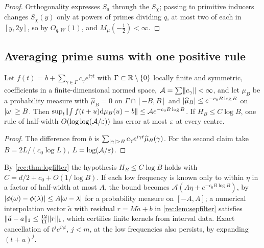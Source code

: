\begin{proof}
Orthogonality expresses $S_a$ through the $S_\chi$; passing to primitive inducers changes $S_\chi(y)$ only at
powers of primes dividing $q$, at most two of each in $[y,2y]$, so by $O_{q,W}(1)$, and $M_\mu(-\tfrac12)<\infty$.
\end{proof}

\subsection{Averaging prime sums with one positive rule}\label{fil:sec:primes}

\begin{theorem}\label{rec:thm:uniformavg}
Let $f(t)=b+\sum_{\gamma\in\Gamma}c_\gamma e^{i\gamma t}$ with $\Gamma\subset\mathbb{R}\setminus\{0\}$ locally finite and symmetric, coefficients in a
finite-dimensional normed space, $\mathcal A=\sum\lVert c_\gamma\rVert<\infty$, and let $\mu_B$ be a probability measure with
$\widehat\mu_B=0$ on $\Gamma\cap[-B,B]$ and $\lvert\widehat\mu_B\rvert\le e^{-c_0B\log B}$ on $\lvert\omega\rvert\ge B$. Then
$\sup_t\lVert\int f(t+u)\mathrm{d}\mu_B(u)-b\rVert\le\mathcal Ae^{-c_0B\log B}$. If $H_B\le C\log B$, one rule of half-width
$O(\log\log(\mathcal A/\varepsilon))$ has error at most $\varepsilon$ at every centre.
\end{theorem}

\begin{proof}
The difference from $b$ is $\sum_{\lvert\gamma\rvert>B}c_\gamma e^{i\gamma t}\widehat\mu_B(\gamma)$. For the second claim take
$B=2L/(c_0\log L)$, $L=\log(\mathcal A/\varepsilon)$.
\end{proof}

By \cref{rec:thm:logfilter} the hypothesis $H_B\le C\log B$ holds with $C=d/2+c_0+O(1/\log B)$. If each low frequency
is known only to within $\eta$ in a factor of half-width at most $A$, the bound becomes
$\mathcal A(A\eta+e^{-c_0B\log B})$, by $\lvert\phi(\omega)-\phi(\lambda)\rvert\le A\lvert\omega-\lambda\rvert$ for a probability measure on $[-A,A]$;
a numerical interpolation vector $\widetilde a$ with residual $r=M\widetilde a+b$ in \cref{rec:lem:sepfilter} satisfies
$\lVert\widetilde a-a\rVert_1\le\tfrac{12}{11}\lVert r\rVert_1$, which certifies finite kernels from interval data. Exact
cancellation of $t^je^{i\gamma t}$, $j<m$, at the low frequencies also persists, by expanding $(t+u)^j$.


